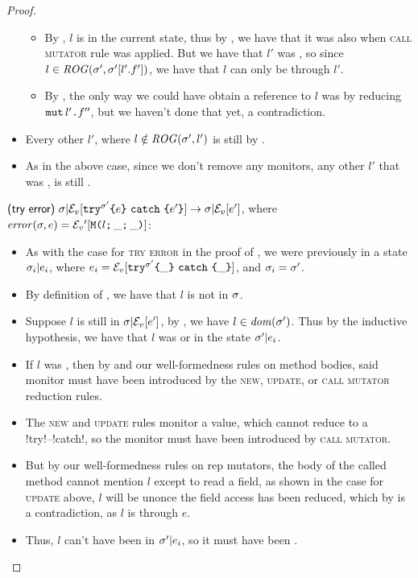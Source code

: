 \begin{proof}
\begin{ienumerate}
\begin{itemize}
\begin{itemize}
				\item By , $l$ is \muty in the current state, thus by , we have that it was also \muty when \textsc{call mutator} rule was applied.
					 But we have that $l'$ was \RCN, so since $l \in \mathit{ROG}(\sigma', \sigma'[l'.f'])$, we have that $l$ can only be \muty through $l'$.

				\item By , the only way we could have obtain a reference to $l$ was by reducing $\texttt{mut}\,l' \texttt{.} f''$, but we haven't done that yet, a contradiction.
			\end{itemize}

		\item Every other \valid $l'$, where $l \notin \mathit{ROG}(\sigma',l')$ is still \valid by .
		\item As in the above case, since we don't remove any monitors, any other $l'$ that was \mony, is still \mony.
	\end{itemize}

			
	\item $\textsf{(try error)}\ \sigma|\mathcal{E}_v{}[\texttt{try}^{\sigma'}\texttt{\{} e\texttt{\}}\ \texttt{catch}\ \texttt{\{} e'\texttt{\}}] \rightarrow \sigma|\mathcal{E}_v{}[e']$, where $\mathit{error}(\sigma, e) = \mathcal{E}_v{}'[\texttt{M}\texttt{(}{}l\texttt{;}\,\_\texttt{;}\,\_\texttt{)}]$:
	\begin{itemize}
		\item As with the case for \textsc{try error} in the proof of , we were previously in a state $\sigma_i|e_i$, where $e_i = \mathcal{E}_v{}[\texttt{try}^{\sigma'}\texttt{\{}\_\texttt{\}}\ \texttt{catch}\ \texttt{\{}\_\texttt{\}}]$, and $\sigma_i = \sigma'$.
		\item By definition of \error, we have that $l$ is not \valid in $\sigma$. 
		\item Suppose $l$ is still \reach in $\sigma|\mathcal{E}_v{}[e']$, by , we have $l \in \mathit{dom}(\sigma')$. Thus by the inductive hypothesis, we have that $l$ was \valid or \mony in the state $\sigma'|e_i$.
		\item If $l$ was \mony, then by \VS and our well-formedness rules on method bodies, said monitor must have been introduced by the \textsc{new}, \textsc{update}, or \textsc{call mutator} reduction rules.
		\item The \textsc{new} and \textsc{update} rules monitor a value, which cannot reduce to a \Q!try!--\Q!catch!, so the monitor must have been introduced by \textsc{call mutator}.
		\item But by our well-formedness rules on rep mutators, the body of the called method cannot mention $l$ except to read a field, 
		as shown in the case for \textsc{update} above, $l$ will be un\reach once the field access has been reduced, which by  is a contradiction, as $l$ is \reach through $e$.
		\item Thus, $l$ can't have been \mony in $\sigma'|e_i$, so it must have been \valid.


\end{itemize}
\end{ienumerate}
\end{proof}
